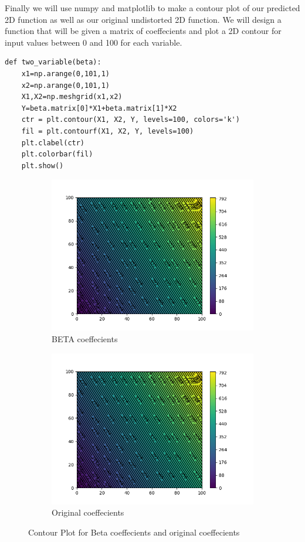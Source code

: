 Finally we will use numpy and matplotlib to make a contour plot of our predicted 2D function as well as our original undistorted 2D function.
We will design a function that will be given a matrix of coeffecients and plot a 2D contour for input values between 0 and 100 for each variable.
\begin{lstlisting}
def two_variable(beta):
    x1=np.arange(0,101,1)
    x2=np.arange(0,101,1)
    X1,X2=np.meshgrid(x1,x2)
    Y=beta.matrix[0]*X1+beta.matrix[1]*X2
    ctr = plt.contour(X1, X2, Y, levels=100, colors='k')
    fil = plt.contourf(X1, X2, Y, levels=100)
    plt.clabel(ctr)
    plt.colorbar(fil)
    plt.show()
\end{lstlisting}
\begin{figure}
    \centering
    \begin{subfigure}{0.5\textwidth}
        \centering
        \includegraphics[scale=0.4]{Figures/predicted.png}
        \caption{BETA coeffecients}
    \end{subfigure}%
    \begin{subfigure}{0.5\textwidth}
        \centering
        \includegraphics[scale=0.4]{Figures/original.png}
        \caption{Original coeffecients}
    \end{subfigure}
    \caption{Contour Plot for Beta coeffecients and original coeffecients}
    
\end{figure}

